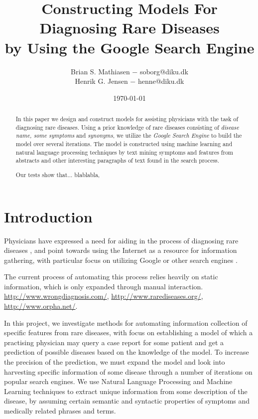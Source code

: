 \documentclass[10pt,letterpaper,draft]{article}
\title{Constructing Models For Diagnosing Rare Diseases\\
        \small{by Using the Google Search Engine}}
\author{Brian S. Mathiasen $-$ soborg@diku.dk \\
        Henrik G. Jensen $-$ henne@diku.dk\\
}
\date{\today} %
\begin{document}
\maketitle
\listoffixmes


\begin{abstract}
In this paper we design and construct models for assisting physicians
with the task of diagnosing rare diseases. Using a prior knowledge of
rare diseases consisting of \textit{disease name, some symptoms} and
\textit{synonyms}, we utilize the \textit{Google Search Engine} to build
the model over several iterations. The model is constructed using
machine learning and natural language processing techniques by text
mining symptoms and features from abstracts and other interesting
paragraphs of text found in the search process.

Our tests show that... blablabla, 
\end{abstract}
\section{Introduction}
\label{chap:introduction}
Physicians have expressed a need for aiding in the process of diagnosing
rare diseases \cite{googlingdiagnosis}, and point towards using the
Internet as a resource for information gathering, with particular focus
on utilizing Google or other search engines \cite{googlechangemedicine}
\cite{diagnosissearchengines}.

The current process of automating this process relies heavily on static
information, which is only expanded through manual interaction. 
\url{http://www.wrongdiagnosis.com/},
\url{http://www.rarediseases.org/}, \url{http://www.orpha.net/}.


In this project, we investigate methods for automating information
collection of specific features from rare diseases, with focus on
establishing a model of which a practising physician may query a case
report for some patient and get a prediction of possible diseases based
on the knowledge of the model.
To increase the precision of the prediction, we must expand the model
and look into harvesting specific information of some disease through a
number of iterations on popular search engines. We use Natural Language
Processing and Machine Learning techniques to extract unique information
from some description of the disease, by assuming certain semantic and
syntactic properties of symptoms and medically related phrases and
terms.
\end{document}
